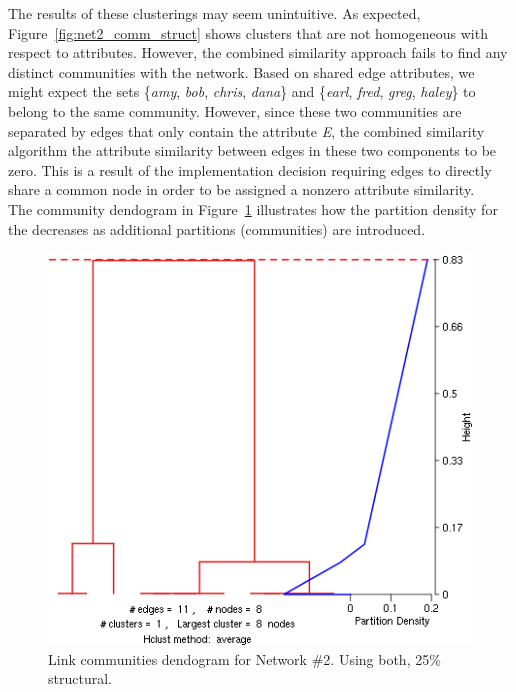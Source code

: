 \documentclass{report} %
\begin{document}
The results of these clusterings may seem unintuitive. As expected, Figure~\ref{fig:net2_comm_struct} shows clusters that are not homogeneous with respect to attributes. However, the combined similarity approach fails to find any distinct communities with the network. Based on shared edge attributes, we might expect the sets \{\textit{amy}, \textit{bob}, \textit{chris}, \textit{dana}\} and \{\textit{earl}, \textit{fred}, \textit{greg}, \textit{haley}\} to belong to the same community. However, since these two communities are separated by edges that only contain the attribute \textit{E}, the combined similarity algorithm the attribute similarity between edges in these two components to be zero. This is a result of the implementation decision requiring edges to directly share a common node in order to be assigned a nonzero attribute similarity. \\

The community dendogram in Figure~\ref{fig:net2_dend} illustrates how the partition density for the decreases as additional partitions (communities) are introduced.




\begin{figure}[htp!]
  \centering
  \includegraphics[width=0.5\linewidth]{toy3/ea/lc_0.25.png}
  \caption{Link communities dendogram for Network \#2. Using both, 25\% structural.}
  \label{fig:net2_dend}
\end{figure}
\end{document}
